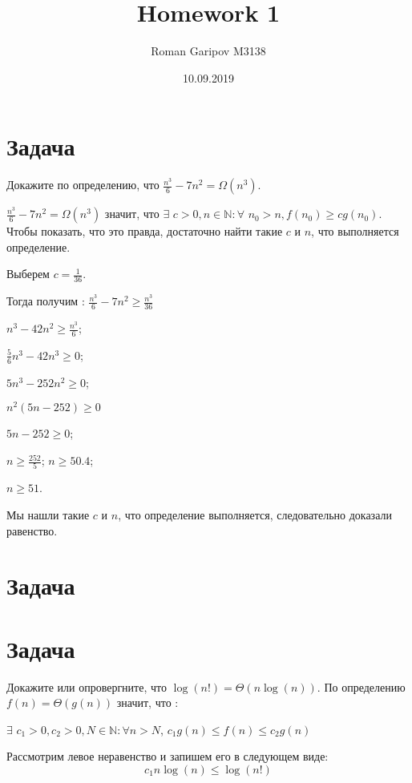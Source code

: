 \documentclass{article}
\title{Homework 1}
\date{10.09.2019}
\author{Roman Garipov M3138}
\begin{document}
  \maketitle %
  \newpage %

\section{Задача }
Докажите по определению, что 	$ \frac{n^{3}}{6} - 7n^{2} = \Omega(n^{3})$.
$$$$


   $ \frac{n^{3}}{6} - 7n^{2} = \Omega(n^{3})$ значит, что $ \exists $ $c > 0,  n \in \mathbb{N}: \forall$ $n_{0} > n, f(n_{0}) \geqslant cg(n_{0})$. 
   Чтобы показать, что это правда, достаточно найти такие $c$ и $n$, что выполняется определение. 
\begin{center}
	Выберем $c = \frac{1}{36}$. 
   
   Тогда получим : $ \frac{n^{3}}{6} - 7n^{2} \geqslant \frac{n^{3}}{36} $
   
    $n^{3} - 42n^{2} \geqslant \frac{n^{3}}{6}$; 
    
    $\frac{5}{6}n^{3} - 42n^{3} \geqslant 0$;
    
     $5n^{3} - 252n^{2} \geqslant 0$; 
     
      $n^{2}(5n - 252) \geqslant 0$ 
    
     $5n - 252 \geqslant 0$; 
     
     $n \geqslant \frac{252}{5}$; $ n \geqslant 50.4$; 
     
     $n \geqslant 51$.
\end{center}     
      Мы нашли такие $c$ и $n$, что определение выполняется, следовательно доказали равенство.
      
\section{Задача }


\section{Задача }
Докажите или опровергните, что $\log(n!) = \Theta(n\log(n))$.
\newline
По определению $f(n) = \Theta(g(n))$ значит, что :
\begin{center}
	$\exists$   $c_{1} > 0, c_{2} > 0, N \in \mathbb{N} : \forall n > N$,  $c_{1}g(n) \leq f(n) \leq c_{2}g(n)$
\end{center}
	Рассмотрим левое неравенство и запишем его в следующем виде:
$$c_{1}n\log(n) \leq \log(n!)$$
\end{document}
